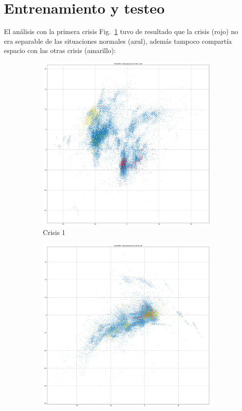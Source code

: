 \documentclass[a4paper,12pt,twoside,oldfontcommands]{memoir}
\begin{document}
\section{Entrenamiento y testeo}
El análisis con la primera crisis Fig.~\ref{fig:pca_crisis1} tuvo de resultado que la crisis (rojo) no era separable de las situaciones normales (azul), además tampoco compartía espacio con las otras crisis (amarillo):

\begin{figure}
    \centering
    \begin{subfigure}[b]{0.45\textwidth}
        \includegraphics[width=\textwidth]{images/PCA-crisis1.png}
        \caption{Crisis 1}
        \label{fig:pca_crisis1}
    \end{subfigure}
    \begin{subfigure}[b]{0.45\textwidth}
        \includegraphics[width=\textwidth]{images/PCA-crisis2.png}

\end{subfigure}
\end{figure}
\end{document}
